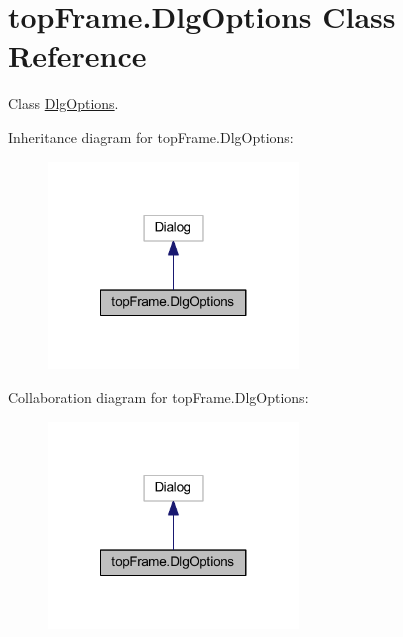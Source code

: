 \hypertarget{classtop_frame_1_1_dlg_options}{\section{top\-Frame.\-Dlg\-Options Class Reference}
\label{classtop_frame_1_1_dlg_options}
}


Class \hyperlink{classtop_frame_1_1_dlg_options}{Dlg\-Options}.  




Inheritance diagram for top\-Frame.\-Dlg\-Options\-:
\nopagebreak
\begin{figure}[H]
\begin{center}
\leavevmode
\includegraphics[width=188pt]{classtop_frame_1_1_dlg_options__inherit__graph}
\end{center}
\end{figure}


Collaboration diagram for top\-Frame.\-Dlg\-Options\-:
\nopagebreak
\begin{figure}[H]
\begin{center}
\leavevmode
\includegraphics[width=188pt]{classtop_frame_1_1_dlg_options__coll__graph}
\end{center}
\end{figure}
